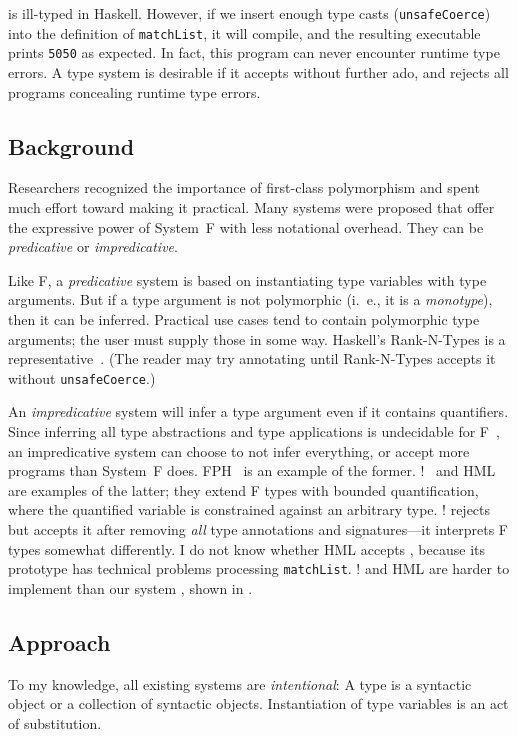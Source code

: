 \documentclass{amsart}
\begin{document}
 is ill-typed in Haskell. However, if we insert enough type
casts (\texttt{unsafeCoerce}) into the definition of
\texttt{matchList}, it will compile, and the resulting executable
prints \texttt{5050} as expected. In fact, this program can never
encounter runtime type errors. A type system is desirable if it
accepts  without further ado, and rejects all programs
concealing runtime type errors.

\subsection{Background} Researchers recognized the importance of
first-class polymorphism and spent much effort toward making it
practical. Many systems were proposed that offer the expressive
power of System~F with less notational overhead. They can be
\emph{predicative} or \emph{impredicative}.

Like F, a \emph{predicative} system is based on instantiating
type variables with type arguments. But if a type argument is not
polymorphic (i.~e., it is a \emph{monotype}), then it can be
inferred. Practical use cases tend to contain polymorphic type
arguments; the user must supply those in some way. Haskell's
Rank-N-Types is a representative~\cite{Jones07}. (The reader may
try annotating  until Rank-N-Types accepts it without
\texttt{unsafeCoerce}.)

An \emph{impredicative} system will infer a type argument even if
it contains quantifiers. Since inferring all type abstractions
and type applications is undecidable for F~\cite{Schubert98}, an
impredicative system can choose to not infer everything, or
accept more programs than System~F does. FPH~\cite{Vytiniotis08}
is an example of the former. \MLF!~\cite{LeBotlan03,RemyMLF} and
HML~\cite{Leijen09} are examples of the latter; they extend F
types with bounded quantification, where the quantified variable
is constrained against an arbitrary type. \MLF! rejects  but
accepts it after removing \emph{all} type annotations and
signatures---it interprets F types somewhat differently. I do not
know whether HML accepts , because its prototype has
technical problems processing \texttt{matchList}. \MLF! and HML
are harder to implement than our system , shown in .

\subsection{Approach}

To my knowledge, all existing systems are \emph{intentional}: A
type is a syntactic object or a collection of syntactic objects.
Instantiation of type variables is an act of substitution.
\end{document}
